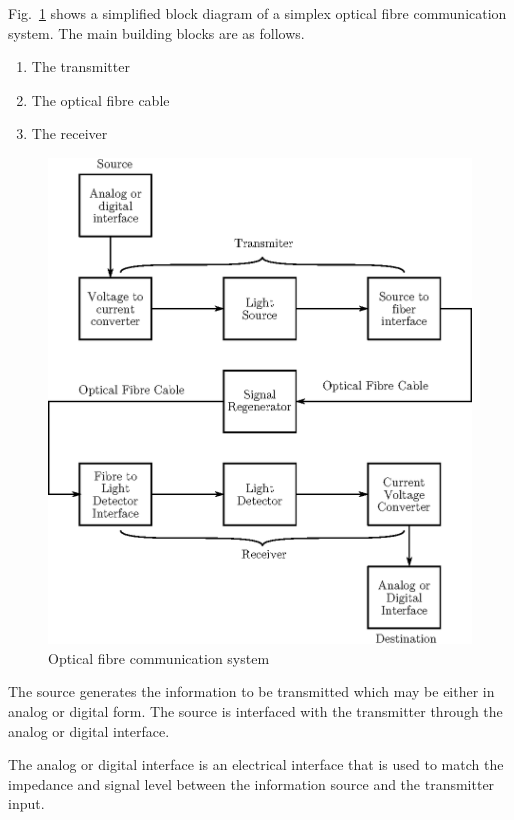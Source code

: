 Fig.~\ref{fig10.7} shows a simplified block diagram of a simplex optical fibre communication system. The main building blocks are as follows.
\begin{enumerate}
\item The transmitter

\item The optical fibre cable

\item The receiver
\end{enumerate}
\begin{figure}[H]
\centering
\includegraphics{chap10/fig10.7.eps}
\caption{Optical fibre communication system}\label{fig10.7}
\end{figure}

The source generates the information to be transmitted which may be either in analog or digital form. The source is interfaced with the transmitter through the analog or digital interface.

The analog or digital interface is an electrical interface that is used to match the impedance and signal level between the information source and the transmitter input.

